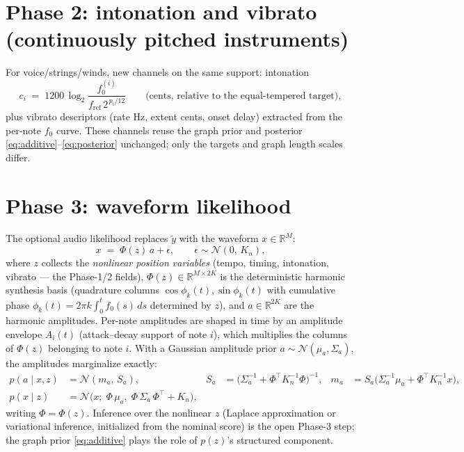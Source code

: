 \documentclass[11pt]{article}
\newcommand{\R}{\mathbb{R}}
\newcommand{\N}{\mathcal{N}}
\begin{document}
\section{Phase 2: intonation and vibrato (continuously pitched instruments)}

For voice/strings/winds, new channels on the same support: intonation
\begin{equation}
  c_i \;=\; 1200 \, \log_2 \frac{f_0^{(i)}}{f_{\mathrm{ref}}\, 2^{\,p_i / 12}}
  \qquad \text{(cents, relative to the equal-tempered target)},
\end{equation}
plus vibrato descriptors (rate Hz, extent cents, onset delay) extracted from the per-note
$f_0$ curve. These channels reuse the graph prior and posterior
\eqref{eq:additive}--\eqref{eq:posterior} unchanged; only the targets and graph length
scales differ.

\section{Phase 3: waveform likelihood}

The optional audio likelihood replaces $\tilde y$ with the waveform $x \in \R^{M}$:
\begin{equation}
  x \;=\; \Phi(z)\, a + \epsilon, \qquad \epsilon \sim \N(0,\, K_n),
  \label{eq:waveform}
\end{equation}
where $z$ collects the \emph{nonlinear position variables} (tempo, timing, intonation,
vibrato --- the Phase-1/2 fields), $\Phi(z) \in \R^{M \times 2K}$ is the deterministic
harmonic synthesis basis (quadrature columns $\cos\phi_k(t), \sin\phi_k(t)$ with
cumulative phase $\phi_k(t) = 2\pi k \int_0^t f_0(s)\, ds$ determined by $z$), and
$a \in \R^{2K}$ are the harmonic amplitudes. Per-note amplitudes are shaped in time by an
amplitude envelope $A_i(t)$ (attack--decay support of note $i$), which multiplies the
columns of $\Phi(z)$ belonging to note $i$. With a Gaussian amplitude prior
$a \sim \N(\mu_a, \Sigma_a)$, the amplitudes marginalize exactly:
\begin{align}
  p(a \mid x, z) &= \N(m_a,\, S_a), &
  S_a &= \bigl( \Sigma_a^{-1} + \Phi^\top K_n^{-1} \Phi \bigr)^{-1}, &
  m_a &= S_a \bigl( \Sigma_a^{-1} \mu_a + \Phi^\top K_n^{-1} x \bigr),
  \label{eq:amp-post}\\[2pt]
  p(x \mid z) &= \N\bigl( x;\; \Phi\, \mu_a,\; \Phi\, \Sigma_a\, \Phi^\top + K_n \bigr),
  \label{eq:collapsed}
\end{align}
writing $\Phi = \Phi(z)$. Inference over the nonlinear $z$ (Laplace approximation or
variational inference, initialized from the nominal score) is the open Phase-3 step; the
graph prior \eqref{eq:additive} plays the role of $p(z)$'s structured component.
\end{document}
